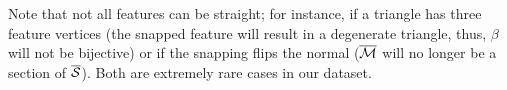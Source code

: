 Note that not all features can be {straight}; for instance, if a triangle has three feature vertices (the snapped feature will result {in} a degenerate triangle, thus, $\beta$ will not be bijective) or if the snapping flips the normal ($\overline{\mathcal{M}}$ will no longer be a section of $\overline{\mathcal{S}}$). Both are extremely rare cases in our dataset.

